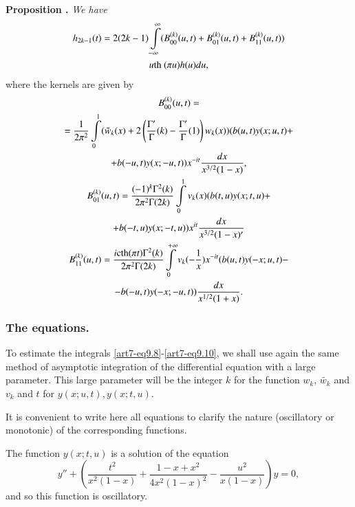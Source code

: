 \medskip
\noindent
{\bfseries Proposition .\label{art7-prop16}}
\textit{We have}
\begin{gather}
h_{2k-1} (t) =2 (2k -1) \int\limits^\infty_{-\infty} (B^{(k)}_{00} (u,t) + B^{(k)}_{01} (u,t) + B^{(k)}_{11} (u,t)) \label{art7-eq9.7}\\
u \text{th } (\pi u) h (u) du, \notag
\end{gather}
where the kernels are given by
\begin{gather}
B^{(k)}_{00} (u,t) = \label{art7-eq9.8}\\
=\frac{1}{2\pi^2} \int\limits^1_0 (\tilde{w}_k(x) + 2 \left(\frac{\Gamma'}{\Gamma} (k) -\frac{\Gamma'}{\Gamma} (1) \right) w_k (x)) (b(u,t) y(x; u, t) +\notag\\
+ b (-u,t) y (x; -u, t) ) x^{-it} \frac{dx}{x^{3/2} (1-x)}, \notag\\
B^{(k)}_{01} (u,t) = \frac{(-1)^k \Gamma^2 (k)}{2 \pi^2 \Gamma(2k)} \int\limits^1_0 v_k(x) (b(t,u)y (x;t,u) +\label{art7-eq9.9}\\
+ b(-t, u) y (x; -t, u)) x^{it} \frac{dx}{x^{3/2} (1-x)'} \notag\\
B^{(k)}_{11} (u,t)  =\frac{i \text{cth} (\pi t) \Gamma^2 (k)}{2 \pi^2 \Gamma (2k)} \int\limits^{+ \infty}_0 v_k(-\frac{1}{x}) x^{-it} (b(u,t)y(-x; u,t) - \label{art7-eq9.10}\\
-b (-u,t) y (-x; -u, t)) \frac{dx}{x^{1/2} (1+x)}.  \notag
\end{gather}\pageoriginale

\setcounter{section}{2}
\subsubsection{The equations.}\label{art7-subsubsec2.8.2}
To estimate the integrals \eqref{art7-eq9.8}-\eqref{art7-eq9.10}, we shall use again the same method of asymptotic integration of the differential equation with a large parameter. This large parameter will be the integer $k$  for the function $w_k$, $\tilde{w_k}$ and $v_k$ and $t$ for $y(x; u, t), y (x; t, u)$.

It is convenient to write here all equations to clarify the nature (oscillatory or monotonic) of the corresponding functions. 

The function $y(x; t, u)$ is a solution of the equation 
\setcounter{section}{9}
\begin{equation}
y'' + \left(\frac{t^2}{x^2 (1-x)} + \frac{1-x+x^2}{4x^2 (1-x)^2} -\frac{u^2}{x(1-x)} \right) y =0, \label{art7-eq9.11}
\end{equation}
and so this function is oscillatory.

